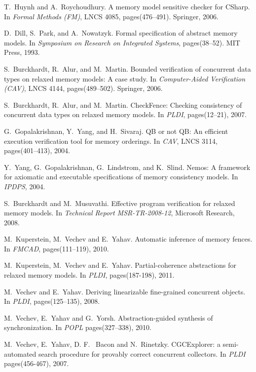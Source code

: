 \documentclass[preprint,9pt]{sigplanconf}
\begin{document}
\begin{thebibliography}{10}
T.~Huynh and A.~Roychoudhury.
\newblock A memory model sensitive checker for CSharp. 
\newblock In {\em Formal Methods (FM)}, LNCS 4085, pages(476–491). Springer, 2006.

D.~Dill, S.~Park, and A.~Nowatzyk. 
\newblock Formal specification of abstract memory models.
\newblock In {\em Symposium on Research on Integrated Systems}, pages(38–52). MIT Press, 1993.

S.~Burckhardt, R.~Alur, and M.~Martin. 
\newblock Bounded verification of concurrent data types on relaxed memory models: A case study. 
\newblock In {\em Computer-Aided Verification (CAV)}, LNCS 4144, pages(489–502). Springer, 2006.

S.~Burckhardt, R.~Alur, and M.~Martin. 
\newblock CheckFence: Checking consistency of concurrent data types on relaxed memory models.
\newblock In {\em PLDI}, pages(12–21), 2007.

G.~Gopalakrishnan, Y.~Yang, and H.~Sivaraj.
\newblock QB or not QB: An efficient execution verification tool for memory orderings.
\newblock In {\em CAV}, LNCS 3114, pages(401–413), 2004.

Y.~Yang, G.~Gopalakrishnan, G.~Lindstrom, and K.~Slind.
\newblock Nemos: A framework for axiomatic and executable specifications of memory consistency models. 
\newblock In {\em IPDPS}, 2004.

S.~Burckhardt and M.~Musuvathi.
\newblock Effective program verification for relaxed memory models.
\newblock In {\em Technical Report MSR-TR-2008-12}, Microsoft Research, 2008.

M.~Kuperstein, M.~Vechev and E.~Yahav.
\newblock Automatic inference of memory fences.
\newblock In {\em FMCAD}, pages(111–119), 2010.

M.~Kuperstein, M.~Vechev and E.~Yahav.
\newblock Partial-coherence abstractions for relaxed memory models.
\newblock In {\em PLDI}, pages(187-198), 2011.

M.~Vechev and E.~Yahav.
\newblock Deriving linearizable fine-grained concurrent objects.
\newblock In {\em PLDI}, pages(125–135), 2008.

M.~Vechev, E.~Yahav and G.~Yorsh.
\newblock Abstraction-guided synthesis of synchronization.
\newblock In {\em POPL}  pages(327–338), 2010.

M.~Vechev, E.~Yahav, D. F.~ Bacon and N.~Rinetzky.
\newblock CGCExplorer: a semi-automated search procedure for provably correct concurrent collectors.
\newblock In {\em PLDI} pages(456-467), 2007.


\end{thebibliography}
\end{document}
